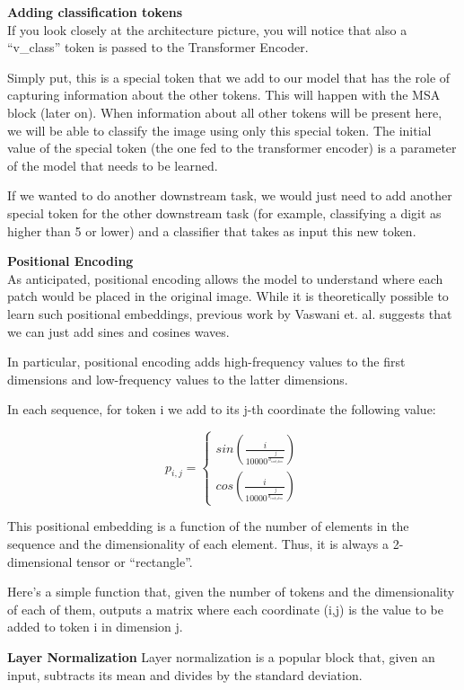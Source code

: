 \textbf{Adding classification tokens} \\
If you look closely at the architecture picture, you will notice that also a “v\_class” token is passed to the Transformer Encoder.

Simply put, this is a special token that we add to our model that has the role of capturing information about the other tokens. This will happen with the MSA block (later on). When information about all other tokens will be present here, we will be able to classify the image using only this special token. The initial value of the special token (the one fed to the transformer encoder) is a parameter of the model that needs to be learned.

If we wanted to do another downstream task, we would just need to add another special token for the other downstream task (for example, classifying a digit as higher than 5 or lower) and a classifier that takes as input this new token.

\textbf{Positional Encoding} \\
As anticipated, positional encoding allows the model to understand where each patch would be placed in the original image. While it is theoretically possible to learn such positional embeddings, previous work by Vaswani et. al. suggests that we can just add sines and cosines waves.

In particular, positional encoding adds high-frequency values to the first dimensions and low-frequency values to the latter dimensions.

In each sequence, for token i we add to its j-th coordinate the following value:


\[p_{i, j} = \left\{\begin{matrix}
sin\left(\frac{i}{10000^{\frac{j}{d_{emb\_dim}}}}\right) \\ cos\left(\frac{i}{10000^{\frac{j}{d_{emb\_dim}}}}\right)
\end{matrix}\right.\]

This positional embedding is a function of the number of elements in the sequence and the dimensionality of each element. Thus, it is always a 2-dimensional tensor or “rectangle”.

Here’s a simple function that, given the number of tokens and the dimensionality of each of them, outputs a matrix where each coordinate (i,j) is the value to be added to token i in dimension j.

\textbf{Layer Normalization}
Layer normalization is a popular block that, given an input, subtracts its mean and divides by the standard deviation.

